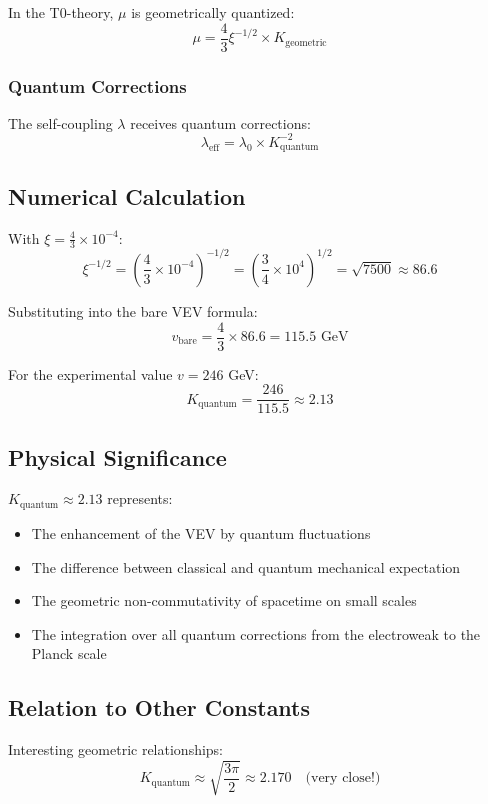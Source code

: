 \documentclass[12pt,a4paper]{article}
\begin{document}
	In the T0-theory, $\mu$ is geometrically quantized:
	\[
	\mu = \frac{4}{3} \xi^{-1/2} \times K_{\text{geometric}}
	\]
	
	\subsubsection{Quantum Corrections}
	
	The self-coupling $\lambda$ receives quantum corrections:
	\[
	\lambda_{\text{eff}} = \lambda_0 \times K_{\text{quantum}}^{-2}
	\]
	
	\subsection{Numerical Calculation}
	
	With $\xi = \frac{4}{3} \times 10^{-4}$:
	\[
	\xi^{-1/2} = \left(\frac{4}{3} \times 10^{-4}\right)^{-1/2} = \left(\frac{3}{4} \times 10^{4}\right)^{1/2} = \sqrt{7500} \approx 86.6
	\]
	
	Substituting into the bare VEV formula:
	\[
	v_{\text{bare}} = \frac{4}{3} \times 86.6 = 115.5 \text{ GeV}
	\]
	
	For the experimental value $v = 246$ GeV:
	\[
	K_{\text{quantum}} = \frac{246}{115.5} \approx 2.13
	\]
	
	\subsection{Physical Significance}
	
	$K_{\text{quantum}} \approx 2.13$ represents:
	\begin{itemize}
		\item The enhancement of the VEV by quantum fluctuations
		\item The difference between classical and quantum mechanical expectation
		\item The geometric non-commutativity of spacetime on small scales
		\item The integration over all quantum corrections from the electroweak to the Planck scale
	\end{itemize}
	
	\subsection{Relation to Other Constants}
	
	Interesting geometric relationships:
	\[
	K_{\text{quantum}} \approx \sqrt{\frac{3\pi}{2}} \approx 2.170 \quad \text{(very close!)}
	\]
	
\end{document}
